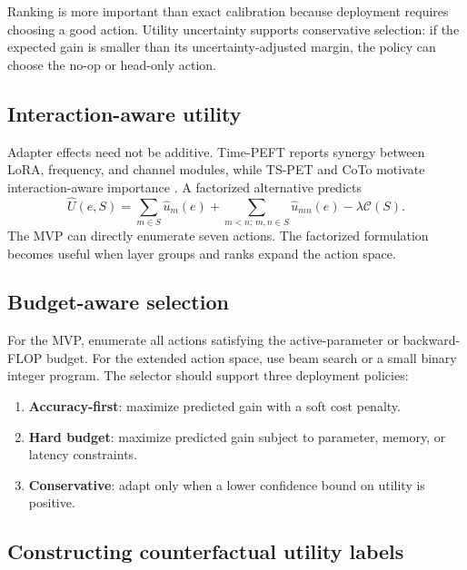 \documentclass[10pt]{article}
\newcommand{\Ccal}{\mathcal{C}}
\begin{document}
Ranking is more important than exact calibration because deployment requires choosing a good action. Utility uncertainty supports conservative selection: if the expected gain is smaller than its uncertainty-adjusted margin, the policy can choose the no-op or head-only action.

\subsection{Interaction-aware utility}

Adapter effects need not be additive. Time-PEFT reports synergy between LoRA, frequency, and channel modules, while TS-PET and CoTo motivate interaction-aware importance \citep{na2026timepeft,zheng2026tspet,zhuang2025coto}. A factorized alternative predicts
\begin{equation}
\widehat U(e,S)=\sum_{m\in S}\widehat u_m(e)+\sum_{m<n;\,m,n\in S}\widehat u_{mn}(e)-\lambda\Ccal(S).
\end{equation}
The MVP can directly enumerate seven actions. The factorized formulation becomes useful when layer groups and ranks expand the action space.

\subsection{Budget-aware selection}

For the MVP, enumerate all actions satisfying the active-parameter or backward-FLOP budget. For the extended action space, use beam search or a small binary integer program. The selector should support three deployment policies:
\begin{enumerate}[leftmargin=*, itemsep=1pt]
    \item \textbf{Accuracy-first}: maximize predicted gain with a soft cost penalty.
    \item \textbf{Hard budget}: maximize predicted gain subject to parameter, memory, or latency constraints.
    \item \textbf{Conservative}: adapt only when a lower confidence bound on utility is positive.
\end{enumerate}

\subsection{Constructing counterfactual utility labels}
\end{document}
